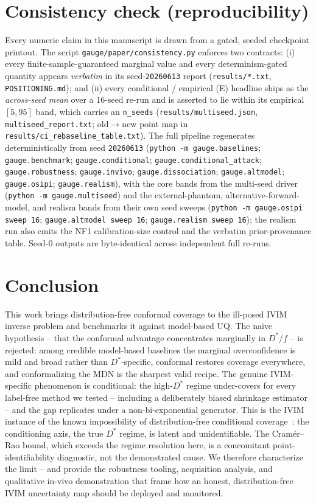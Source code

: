 \documentclass[11pt]{article}
\newcommand{\Dstar}{D^{*}}
\begin{document}
\section{Consistency check (reproducibility)}
\label{sec:consistency}
Every numeric claim in this manuscript is drawn from a gated, seeded checkpoint
printout. The script \texttt{gauge/paper/consistency.py} enforces two contracts:
(i) every finite-sample-guaranteed marginal value and every determinism-gated
quantity appears \emph{verbatim} in its seed-\texttt{20260613} report
(\texttt{results/*.txt}, \texttt{POSITIONING.md}); and (ii) every conditional /
empirical (E) headline ships as the \emph{across-seed mean} over a 16-seed re-run
and is asserted to lie within its empirical $[5,95]$ band, which carries an
\texttt{n\_seeds} (\texttt{results/multiseed.json}, \texttt{multiseed\_report.txt};
old$\to$new point map in \texttt{results/ci\_rebaseline\_table.txt}). The full
pipeline regenerates deterministically from seed \texttt{20260613}
(\texttt{python -m gauge.baselines}; \texttt{gauge.benchmark};
\texttt{gauge.conditional}; \texttt{gauge.conditional\_attack};
\texttt{gauge.robustness}; \texttt{gauge.invivo}; \texttt{gauge.dissociation};
\texttt{gauge.altmodel}; \texttt{gauge.osipi}; \texttt{gauge.realism}), with the
core bands from the multi-seed driver (\texttt{python -m gauge.multiseed}) and the
external-phantom, alternative-forward-model, and realism bands from their own
seed sweeps (\texttt{python -m gauge.osipi sweep 16}; \texttt{gauge.altmodel sweep
16}; \texttt{gauge.realism sweep 16}); the realism run also emits the NF1
calibration-size control and the verbatim prior-provenance table. Seed-0 outputs are
byte-identical across independent full re-runs.

\section{Conclusion}
This work brings distribution-free conformal coverage to the ill-posed IVIM inverse
problem and benchmarks it against model-based UQ. The naive hypothesis -- that the
conformal advantage concentrates marginally in $\Dstar/f$ -- is rejected:
among credible model-based baselines the marginal overconfidence is mild and
broad rather than $\Dstar$-specific, conformal restores coverage everywhere, and
conformalizing the MDN is the sharpest valid recipe. The genuine
IVIM-specific phenomenon is conditional: the high-$\Dstar$ regime under-covers
for every label-free method we tested -- including a deliberately biased
shrinkage estimator -- and the gap replicates under a non-bi-exponential
generator. This is the IVIM instance of the known impossibility of
distribution-free conditional coverage~\citep{barber2021limits}: the conditioning
axis, the true $\Dstar$ regime, is latent and unidentifiable. The Cram\'er--Rao
bound, which exceeds the regime resolution here, is a concomitant
point-identifiability diagnostic, not the demonstrated cause. We therefore characterize
the limit -- and provide the robustness tooling, acquisition analysis, and
qualitative in-vivo demonstration that frame how an honest, distribution-free IVIM
uncertainty map should be deployed and monitored.
\end{document}
